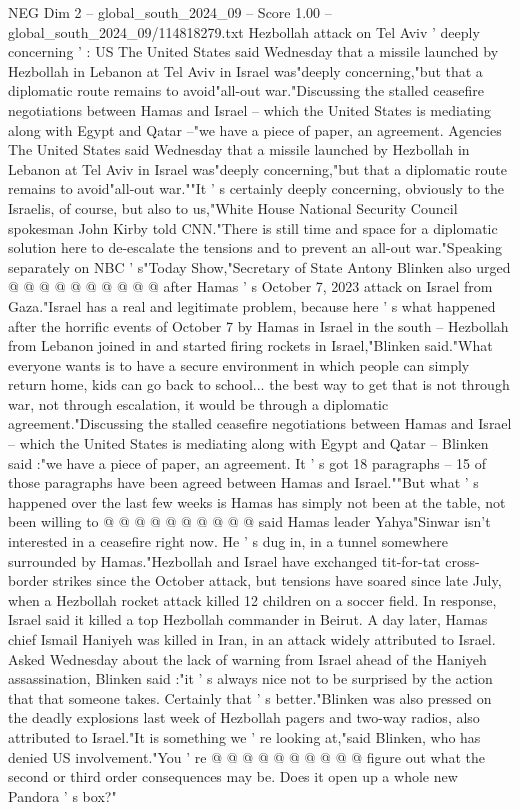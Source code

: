 \begin{textsample}{NEG Dim 2 – global\_south\_2024\_09 – Score 1.00 – global\_south\_2024\_09/114818279.txt}  \label{ex:f2_neg_254}
Hezbollah attack on Tel Aviv ' deeply concerning ' : US The United States said Wednesday that a missile launched by Hezbollah in Lebanon at Tel Aviv in Israel was"deeply concerning,"but that a diplomatic route remains to avoid"all-out war."Discussing the stalled ceasefire negotiations between Hamas and Israel -- which the United States is mediating along with Egypt and Qatar --"we have a piece of paper, an agreement.
Agencies The United States said Wednesday that a missile launched by Hezbollah in Lebanon at Tel Aviv in Israel was"deeply concerning,"but that a diplomatic route remains to avoid"all-out war.""It ' s certainly deeply concerning, obviously to the Israelis, of course, but also to us,"White House National Security Council spokesman John Kirby told CNN."There is still time and space for a diplomatic solution here to de-escalate the tensions and to prevent an all-out war."Speaking separately on NBC ' s"Today Show,"Secretary of State Antony Blinken also urged @ @ @ @ @ @ @ @ @ @ after Hamas ' s October 7, 2023 attack on Israel from Gaza."Israel has a real and legitimate problem, because here ' s what happened after the horrific events of October 7 by Hamas in Israel in the south -- Hezbollah from Lebanon joined in and started firing rockets in Israel,"Blinken said."What everyone wants is to have a secure environment in which people can simply return home, kids can go back to school... the best way to get that is not through war, not through escalation, it would be through a diplomatic agreement."Discussing the stalled ceasefire negotiations between Hamas and Israel -- which the United States is mediating along with Egypt and Qatar -- Blinken said :"we have a piece of paper, an agreement.
It ' s got 18 paragraphs -- 15 of those paragraphs have been agreed between Hamas and Israel.""But what ' s happened over the last few weeks is Hamas has simply not been at the table, not been willing to @ @ @ @ @ @ @ @ @ @ said Hamas leader Yahya"Sinwar isn't interested in a ceasefire right now.
He ' s dug in, in a tunnel somewhere surrounded by Hamas."Hezbollah and Israel have exchanged tit-for-tat cross-border strikes since the October attack, but tensions have soared since late July, when a Hezbollah rocket attack killed 12 children on a soccer field.
In response, Israel said it killed a top Hezbollah commander in Beirut.
A day later, Hamas chief Ismail Haniyeh was killed in Iran, in an attack widely attributed to Israel.
Asked Wednesday about the lack of warning from Israel ahead of the Haniyeh assassination, Blinken said :"it ' s always nice not to be surprised by the action that that someone takes.
Certainly that ' s better."Blinken was also pressed on the deadly explosions last week of Hezbollah pagers and two-way radios, also attributed to Israel."It is something we ' re looking at,"said Blinken, who has denied US involvement."You ' re @ @ @ @ @ @ @ @ @ @ figure out what the second or third order consequences may be.
Does it open up a whole new Pandora ' s box?"

\end{textsample}
